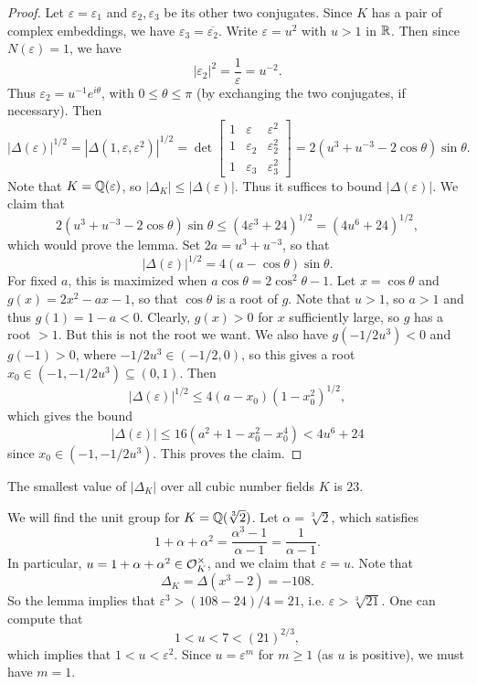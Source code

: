 \begin{proof}
  Let $\varepsilon = \varepsilon_1$ and
  $\varepsilon_2, \varepsilon_3$ be its other two
  conjugates. Since $K$ has a pair of complex embeddings,
  we have $\varepsilon_3 = \overline{\varepsilon_2}$.
  Write $\varepsilon = u^2$ with $u > 1$ in $\mathbb{R}$.
  Then since $N(\varepsilon) = 1$, we have
  \[
    |\varepsilon_2|^2 = \frac{1}{\varepsilon} = u^{-2}.
  \]
  Thus $\varepsilon_2 = u^{-1} e^{i\theta}$, with
  $0 \le \theta \le \pi$ (by exchanging the two
  conjugates, if necessary). Then
  \[
    |\Delta(\varepsilon)|^{1 / 2}
    = |\Delta(1, \varepsilon, \varepsilon^2)|^{1 / 2}
    =
    \det
    \begin{bmatrix}
      1 & \varepsilon & \varepsilon^2 \\
      1 & \varepsilon_2 & \varepsilon_2^2 \\
      1 & \varepsilon_3 & \varepsilon_3^2
    \end{bmatrix}
    = 2(u^3 + u^{-3} - 2\cos \theta) \sin \theta.
  \]
  Note that $K = \mathbb{Q}(\varepsilon)$, so
  $|\Delta_K| \le |\Delta(\varepsilon)|$. Thus it
  suffices to bound $|\Delta(\varepsilon)|$. We claim
  that
  \[
    2(u^3 + u^{-3} - 2\cos \theta) \sin \theta
    \le (4 \varepsilon^3 + 24)^{1 / 2} = (4u^6 + 24)^{1 / 2},
  \]
  which would prove the lemma. Set $2a = u^3 + u^{-3}$,
  so that
  \[
    |\Delta(\varepsilon)|^{1 / 2}
    = 4(a - \cos \theta) \sin \theta.
  \]
  For fixed $a$, this is maximized when
  $a \cos \theta = 2 \cos^2 \theta - 1$.
  Let $x = \cos \theta$ and $g(x) = 2x^2 - ax - 1$, so
  that $\cos \theta$ is a root of $g$.
  Note that $u > 1$, so $a > 1$ and thus
  $g(1) = 1 - a < 0$. Clearly, $g(x) > 0$ for $x$
  sufficiently large, so $g$ has a root $> 1$.
  But this is not the root we want.
  We also have $g(-1 / 2u^3) < 0$ and
  $g(-1) > 0$,
  where $-1 / 2u^3 \in (-1 / 2, 0)$, so this gives
  a root $x_0 \in (-1, -1 / 2u^3) \subseteq (0, 1)$. Then
  \[
    |\Delta(\varepsilon)|^{1 / 2} \le 4(a - x_0)(1 - x_0^2)^{1 / 2},
  \]
  which gives the bound
  \[
    |\Delta(\varepsilon)| \le 16(a^2 + 1 - x_0^2 - x_0^{4})
    < 4u^6 + 24
  \]
  since $x_0 \in (-1, -1 / 2u^3)$. This proves the
  claim.
\end{proof}

\begin{remark}
  The smallest value of $|\Delta_K|$ over all cubic
  number fields $K$ is $23$.
\end{remark}

\begin{example}
  We will find the unit group for $K = \mathbb{Q}(\sqrt[3]{2})$.
  Let $\alpha = \sqrt[3]{2}$, which satisfies
  \[
    1 + \alpha + \alpha^2 = \frac{\alpha^3 - 1}{\alpha - 1} = \frac{1}{\alpha - 1}.
  \] 
  In particular, $u = 1 + \alpha + \alpha^2 \in \mathcal{O}_K^\times$,
  and we claim that
  $\varepsilon = u$. Note that
  \[
    \Delta_K = \Delta(x^3 - 2) = -108.
  \]
  So the lemma implies that
  $\varepsilon^3 > (108 - 24) / 4 = 21$, i.e.
  $\varepsilon > \sqrt[3]{21}$. One can compute that
  \[
    1 < u < 7 < (21)^{2 / 3},
  \]
  which implies that $1 < u < \varepsilon^2$.
  Since $u = \varepsilon^m$ for $m \ge 1$ (as $u$
  is positive), we must have $m = 1$.
\end{example}

